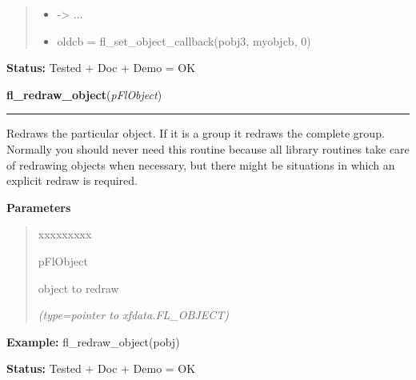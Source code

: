 \begin{boxedminipage}{\funcwidth}
\begin{quote}
\begin{itemize}
  \item {\textbar}-{\textgreater}{\textbar} ...



  \item oldcb = fl\_set\_object\_callback(pobj3, myobjcb, 0)



\end{itemize}

\end{quote}

\textbf{Status:} Tested + Doc + Demo = OK



    \end{boxedminipage}

    \label{xformslib:flbasic:fl_redraw_object}

    \vspace{0.5ex}

\hspace{.8\funcindent}\begin{boxedminipage}{\funcwidth}

    \raggedright \textbf{fl\_redraw\_object}(\textit{pFlObject})

    \vspace{-1.5ex}

    \rule{\textwidth}{0.5\fboxrule}
\setlength{\parskip}{2ex}
    Redraws the particular object. If it is a group it redraws the complete
    group. Normally you should never need this routine because all library 
    routines take care of redrawing objects when necessary, but there might
    be situations in which an explicit redraw is required.

\setlength{\parskip}{1ex}
      \textbf{Parameters}
      \vspace{-1ex}

      \begin{quote}
        \begin{Ventry}{xxxxxxxxx}

          \item[pFlObject]

          object to redraw

            {\it (type=pointer to xfdata.FL\_OBJECT)}

        \end{Ventry}

      \end{quote}

\textbf{Example:} fl\_redraw\_object(pobj)



\textbf{Status:} Tested + Doc + Demo = OK



    \end{boxedminipage}

